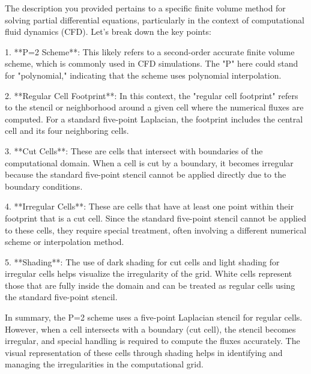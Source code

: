 The description you provided pertains to a specific finite volume method for solving partial differential equations, particularly in the context of computational fluid dynamics (CFD). Let's break down the key points:

1. **P=2 Scheme**: This likely refers to a second-order accurate finite volume scheme, which is commonly used in CFD simulations. The "P" here could stand for "polynomial," indicating that the scheme uses polynomial interpolation.

2. **Regular Cell Footprint**: In this context, the "regular cell footprint" refers to the stencil or neighborhood around a given cell where the numerical fluxes are computed. For a standard five-point Laplacian, the footprint includes the central cell and its four neighboring cells.

3. **Cut Cells**: These are cells that intersect with boundaries of the computational domain. When a cell is cut by a boundary, it becomes irregular because the standard five-point stencil cannot be applied directly due to the boundary conditions.

4. **Irregular Cells**: These are cells that have at least one point within their footprint that is a cut cell. Since the standard five-point stencil cannot be applied to these cells, they require special treatment, often involving a different numerical scheme or interpolation method.

5. **Shading**: The use of dark shading for cut cells and light shading for irregular cells helps visualize the irregularity of the grid. White cells represent those that are fully inside the domain and can be treated as regular cells using the standard five-point stencil.

In summary, the P=2 scheme uses a five-point Laplacian stencil for regular cells. However, when a cell intersects with a boundary (cut cell), the stencil becomes irregular, and special handling is required to compute the fluxes accurately. The visual representation of these cells through shading helps in identifying and managing the irregularities in the computational grid.